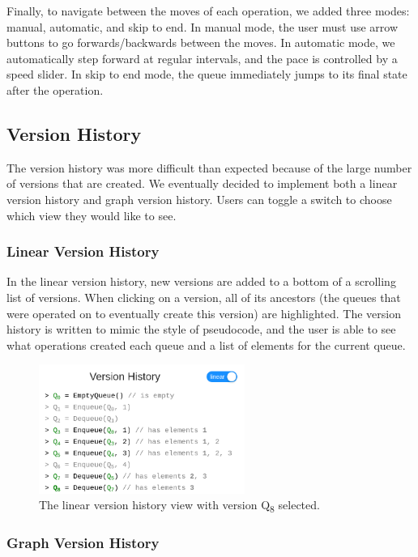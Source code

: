 \documentclass[runningheads]{llncs}
\begin{document}
Finally, to navigate between the moves of each operation, we added three modes: manual, automatic, and skip to end. In manual mode, the user must use arrow buttons to go forwards/backwards between the moves. In automatic mode, we automatically step forward at regular intervals, and the pace is controlled by a speed slider. In skip to end mode, the queue immediately jumps to its final state after the operation.

\subsection{Version History}

The version history was more difficult than expected because of the large number of versions that are created. We eventually decided to implement both a linear version history and graph version history. Users can toggle a switch to choose which view they would like to see.

\subsubsection{Linear Version History}

In the linear version history, new versions are added to a bottom of a scrolling list of versions. When clicking on a version, all of its ancestors (the queues that were operated on to eventually create this version) are highlighted. The version history is written to mimic the style of pseudocode, and the user is able to see what operations created each queue and a list of elements for the current queue.

\begin{figure}[H]
    \centering
    \includegraphics[width=0.6\textwidth]{linear.png}
    \caption{The linear version history view with version Q\textsubscript{8} selected.}
\end{figure}

\subsubsection{Graph Version History}
\end{document}
